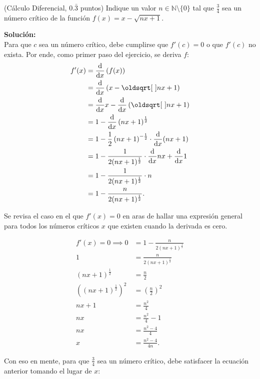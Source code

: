 \documentclass{fmbvecto}
\begin{document}
\begin{problema}
    (Cálculo Diferencial, \(0.\bar{3}\) puntos) Indique un valor \(n \in \mathbb{N} \setminus \{0\}\) tal que \(\frac{3}{4}\) sea un número crítico de la función \(f(x)=x-\sqrt{nx+1}\).

\vspace{1em}
\tcblower
\textbf{Solución:}\\

Para que \(c\) sea un número crítico, debe cumplirse que \(f'(c)=0\) o que \(f'(c)\) no exista. Por ende, como primer paso del ejercicio, se deriva \(f\):
\begin{align*}
    f'(x) &= \der\left(f(x)\right) \\
    &= \der\left(x-\sqrt{nx+1}\right) \\
    &= \der x - \der\left(\sqrt{nx+1}\right) \\
    &= 1 - \der\left(nx+1\right)^{\frac{1}{2}} \\
    &= 1 - \frac{1}{2}\left(nx+1\right)^{-\frac{1}{2}} \cdot \der(nx+1)\\
    &= 1 - \frac{1}{2(nx+1)^{\frac{1}{2}}} \cdot \der nx+\der 1\\
    &= 1 - \frac{1}{2(nx+1)^{\frac{1}{2}}} \cdot n\\
    &= 1 - \frac{n}{2(nx+1)^{\frac{1}{2}}}.
\end{align*}

Se revisa el caso en el que \(f'(x) = 0\) en aras de hallar una expresión general para todos los números críticos \(x\) que existen cuando la derivada es cero. 

\begin{align*}
    f'(x) = 0 \implies 0 &= 1 - \frac{n}{2(nx+1)^{\frac{1}{2}}} \\
    1 &= \frac{n}{2(nx+1)^{\frac{1}{2}}} \\
    (nx+1)^{\frac{1}{2}} &= \frac{n}{2} \\
    ((nx+1)^{\frac{1}{2}})^2 &= \left(\frac{n}{2}\right)^2 \\
    nx+1 &= \frac{n^2}{4} \\
    nx &= \frac{n^2}{4}-1 \\
    nx &= \frac{n^2-4}{4} \\
    x &= \frac{n^2-4}{4n}.
\end{align*}

Con eso en mente, para que \(\frac{3}{4}\) sea un número crítico, debe satisfacer la ecuación anterior tomando el lugar de \(x\):


\end{problema}
\end{document}
